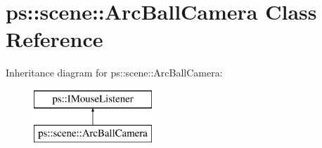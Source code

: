\hypertarget{classps_1_1scene_1_1ArcBallCamera}{}\section{ps\+:\+:scene\+:\+:Arc\+Ball\+Camera Class Reference}
\label{classps_1_1scene_1_1ArcBallCamera}
Inheritance diagram for ps\+:\+:scene\+:\+:Arc\+Ball\+Camera\+:\begin{figure}[H]
\begin{center}
\leavevmode
\includegraphics[height=2.000000cm]{classps_1_1scene_1_1ArcBallCamera}
\end{center}
\end{figure}
